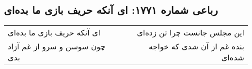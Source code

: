 \begin{center}
\section*{رباعی شماره ۱۷۷۱: ای آنکه حریف بازی ما بده‌ای}
\label{sec:1771}
\begin{longtable}{l p{0.5cm} r}
ای آنکه حریف بازی ما بده‌ای
&&
این مجلس جانست چرا تن زده‌ای
\\
چون سوسن و سرو از غم آزاد بدی
&&
بنده غم از آن شدی که خواجه شده‌ای
\\
\end{longtable}
\end{center}
